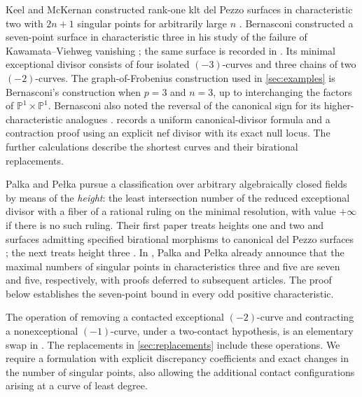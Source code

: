 \documentclass[11pt,reqno]{amsart}
\theoremstyle{definition}
\theoremstyle{remark}
\newcommand{\PP}{\mathbb P}
\numberwithin{equation}{section}
\begin{document}
Keel and McKernan constructed rank-one klt del Pezzo surfaces in
characteristic two with $2n+1$ singular points for arbitrarily large
$n$ \cite[Section~9]{KeelMcKernan}. Bernasconi constructed a
seven-point surface in characteristic three in his study of the failure
of Kawamata--Viehweg vanishing \cite[Section~3.1]{Bernasconi}; the
same surface is recorded in \cite[Example~7.4]{Lacini}. Its minimal
exceptional divisor consists of four isolated $(-3)$-curves and three
chains of two $(-2)$-curves. The graph-of-Frobenius construction used in
\cref{sec:examples} is Bernasconi's construction when $p=3$ and $n=3$,
up to interchanging the factors of $\PP^1\times\PP^1$.
Bernasconi also noted the reversal of the canonical sign for its
higher-characteristic analogues \cite[Remark~3.3]{Bernasconi}.
 records a uniform canonical-divisor formula and a
contraction proof using an explicit nef divisor with its exact null
locus. The further calculations describe the shortest curves and their
birational replacements.

Palka and Pe\l ka pursue a classification over arbitrary algebraically
closed fields by means of the \emph{height}: the least intersection
number of the reduced exceptional divisor with a fiber of a rational
ruling on the minimal resolution, with value $+\infty$ if there is no
such ruling. Their first paper treats heights one
and two and surfaces admitting specified birational morphisms to
canonical del Pezzo surfaces \cite{PalkaPelkaI}; the next treats height
three \cite{PalkaPelkaIII}. In \cite[Remark~1.7]{PalkaPelkaI},
Palka and Pe\l ka already announce that the maximal numbers of singular
points in characteristics three and five are seven and five,
respectively, with proofs deferred to subsequent articles. The proof below establishes the seven-point bound in every odd positive characteristic.

The operation of removing a contacted exceptional $(-2)$-curve
and contracting a nonexceptional $(-1)$-curve, under a two-contact
hypothesis, is an elementary swap in
\cite[Definition~1.3 and Lemma~2.9]{PalkaPelkaI}. The replacements in
\cref{sec:replacements} include these operations. We require a
formulation with explicit discrepancy coefficients and exact changes
in the number of singular points, also allowing the additional contact
configurations arising at a curve of least degree.
\end{document}
